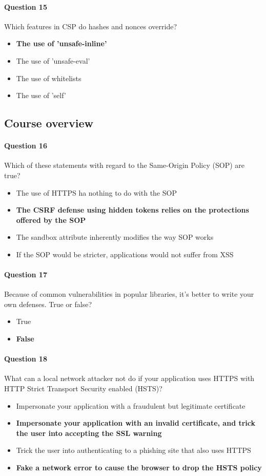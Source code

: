 \documentclass[titlepage]{article}
\begin{document}
    \paragraph{Question 15} Which features in CSP do hashes and nonces override?
    \begin{itemize}
        \item \textbf{The use of 'unsafe-inline'} \checkmark
        \item The use of 'unsafe-eval'
        \item The use of whitelists
        \item The use of 'self'
    \end{itemize}
    \subsection{Course overview}
    \paragraph{Question 16} Which of these statements with regard to the Same-Origin Policy (SOP) are true?
    \begin{itemize}
        \item The use of HTTPS ha nothing to do with the SOP
        \item \textbf{The CSRF defense using hidden tokens relies on the protections offered by the SOP} \checkmark
        \item The sandbox attribute inherently modifies the way SOP works
        \item If the SOP would be stricter, applications would not suffer from XSS
    \end{itemize}
    \paragraph{Question 17} Because of common vulnerabilities in popular libraries, it's better to write your own defenses. True or false?
    \begin{itemize}
        \item True
        \item \textbf{False} \checkmark
    \end{itemize}
    \paragraph{Question 18} What can a local network attacker not do if your application uses HTTPS with HTTP Strict Transport Security enabled (HSTS)?
    \begin{itemize}
        \item Impersonate your application with a fraudulent but legitimate certificate
        \item \textbf{Impersonate your application with an invalid certificate, and trick the user into accepting the SSL warning} \checkmark
        \item Trick the user into authenticating to a phishing site that also uses HTTPS
        \item \textbf{Fake a network error to cause the browser to drop the HSTS policy} \checkmark
    \end{itemize}
\end{document}
